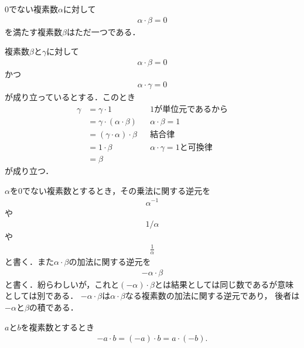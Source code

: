 	\begin{screen}
		\begin{thm}[乗法に関する逆元はただ一つ]
			$0$でない複素数$\alpha$に対して
			\begin{align}
				\alpha \cdot \beta = 0
			\end{align}
			を満たす複素数$\beta$はただ一つである．
		\end{thm}
	\end{screen}
	
	\begin{sketch}
		複素数$\beta$と$\gamma$に対して
		\begin{align}
			\alpha \cdot \beta = 0
		\end{align}
		かつ
		\begin{align}
			\alpha \cdot \gamma = 0
		\end{align}
		が成り立っているとする．このとき
		\begin{align}
			\gamma &= \gamma \cdot 1 &&\mbox{$1$が単位元であるから} \\
			&= \gamma \cdot (\alpha \cdot \beta) &&\mbox{$\alpha \cdot \beta = 1$} \\
			&= (\gamma \cdot \alpha) \cdot \beta &&\mbox{結合律} \\
			&= 1 \cdot \beta &&\mbox{$\alpha \cdot \gamma = 1$と可換律} \\
			&= \beta
		\end{align}
		が成り立つ．
		\QED
	\end{sketch}
	
	$\alpha$を$0$でない複素数とするとき，その乗法に関する逆元を
	\begin{align}
		\alpha^{-1}
	\end{align}
	や
	\begin{align}
		1/\alpha
	\end{align}
	や
	\begin{align}
		\frac{1}{\alpha}
	\end{align}
	と書く．また$\alpha \cdot \beta$の加法に関する逆元を
	\begin{align}
		- \alpha \cdot \beta
	\end{align}
	と書く．紛らわしいが，これと$(-\alpha) \cdot \beta$とは結果としては同じ数であるが意味としては別である．
	$-\alpha \cdot \beta$は$\alpha \cdot \beta$なる複素数の加法に関する逆元であり，
	後者は$-\alpha$と$\beta$の積である．
	
	\begin{screen}
		\begin{thm}[積の逆元は逆元の積]
		\label{thm:inverse_of_product}
			$a$と$b$を複素数とするとき
			\begin{align}
				-a \cdot b = (-a) \cdot b = a \cdot (-b).
			\end{align}
		\end{thm}
	\end{screen}
	
